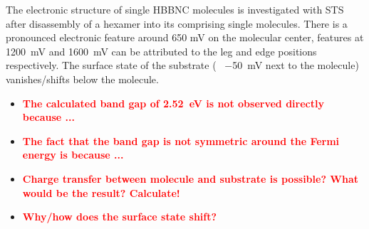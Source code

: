 The electronic structure of single HBBNC molecules is investigated with STS after disassembly of a hexamer into its comprising single molecules. There is a pronounced electronic feature around 650 mV on the molecular center, features at \SI{1200}{\milli \volt} and \SI{1600}{\milli \volt} can be attributed to the leg and edge positions respectively. The surface state of the substrate (~ \SI{-50}{\milli \volt} next to the molecule) vanishes/shifts below the molecule. 
\begin{itemize}
	\item \textbf{\textcolor{red}{The calculated band gap of \SI{2.52}{\eV} is not observed directly because ...}}
	\item \textbf{\textcolor{red}{The fact that the band gap is not symmetric around the Fermi energy is because ...}}
	\item \textbf{\textcolor{red}{Charge transfer between molecule and substrate is possible? What would be the result? Calculate!}}
	\item \textbf{\textcolor{red}{Why/how does the surface state shift?}}
\end{itemize}


